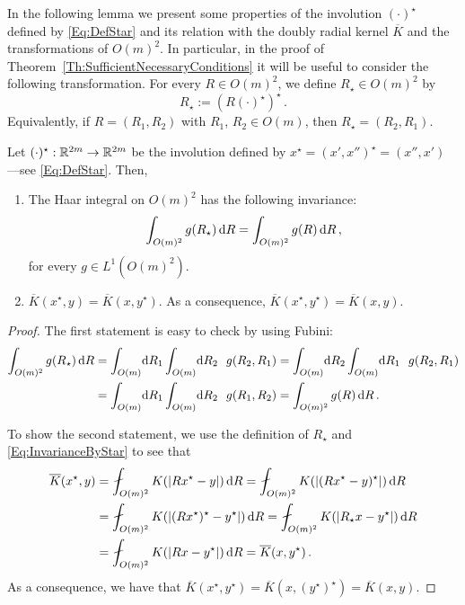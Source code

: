In the following lemma we present some properties of the involution $(\cdot)^\star$ defined by \eqref{Eq:DefStar} and its relation with the doubly radial kernel $\overline{K}$ and the transformations of $O(m)^2$. In particular, in the proof of Theorem~\ref{Th:SufficientNecessaryConditions} it will be useful to consider the following transformation. For every $R\in O(m)^2$, we define  $R_\star\in O(m)^2$ by 
\begin{equation}
	\label{Eq:DefRStar}
	R_\star := (R(\cdot)^\star)^\star\,.
\end{equation}
Equivalently, if $R = (R_1, R_2)$ with $R_1$, $R_2 \in O(m)$, then $R_\star = (R_2, R_1)$.

\begin{lemma}
\label{Lemma:PropertiesStar}
Let $(\cdot)^\star: \mathbb{R}^{2m} \to \mathbb{R}^{2m}$ be the involution defined by $x^\star = (x',x'')^\star = (x'', x')$
---see \eqref{Eq:DefStar}.
Then,
\begin{enumerate}
\item
The Haar integral on $O(m)^2$ has the following invariance:
\begin{equation}
\label{Eq:InvarianceByStar}
\int_{O(m)^2} g(R_\star) \,\mathrm{d} R = \int_{O(m)^2} g(R) \,\mathrm{d} R \,,
\end{equation}
for every $g \in L^1(O(m)^2)$.
\item $\overline{K}(x^\star,y) = \overline{K} (x,y^\star)$. As a consequence, $\overline{K}(x^\star,y^\star) = \overline{K} (x,y)$.
\end{enumerate}
\end{lemma}

\begin{proof}
The first statement is easy to check by using Fubini:
\begin{align*}
\int_{O(m)^2} g(R_\star) \d R & = \int_{O(m)} \!\! \d R_1 \int_{O(m)} \!\! \d R_2 \ \ g(R_2, R_1)  =  \int_{O(m)} \!\! \d R_2 \int_{O(m)} \!\! \d R_1 \ \ g(R_2, R_1) \\
& =  \int_{O(m)} \!\! \d R_1 \int_{O(m)} \!\! \d R_2 \ \ g(R_1, R_2)  =  \int_{O(m)^2} g(R) \d R\,.
\end{align*}

To show the second statement, we use the definition of $R_\star$ and \eqref{Eq:InvarianceByStar}
to see that
\begin{align*}
\overline{K}(x^\star,y) &= \average_{O(m)^2} K(|Rx^\star - y|) \d R = \average_{O(m)^2} K(|(Rx^\star - y)^\star|) \d R \\
&= \average_{O(m)^2} K(|(R x^\star)^\star - y^\star|) \d R = \average_{O(m)^2} K(|R_\star x - y^\star|) \d R \\
&= \average_{O(m)^2} K(|Rx - y^\star|) \d R = \overline{K}(x,y^\star)\,.
\end{align*}
As a consequence, we have that $\overline{K}(x^\star,y^\star) = \overline{K}(x,(y^\star)^\star) = \overline{K}(x,y)$.
\end{proof}

